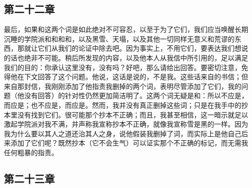 
\subsection{第二十二章}

最后，如果和这两个词是如此绝对不可容忍，以至于为了它们，我们应当唤醒长期沉睡的学院派和和和和，以及黑雪、天塌，以及其他一切同样无意义和荒谬的东西，那就让它们从我们的论证中除去吧。因为事实上，不用它们，要表达我们想说的话也绝非不可能。稍后所发现的内容，以及他本人从我信中所引用的，足以满足我们的目的：你承认这里没有，没有吗？好吧，那么请给出回答。要密切注意，免得他在下文回答了这个问题。他说，这话是说的，不是我。这些话来自的书信；但来自那封信，我刚刚添加了他指责我删掉的两个词，表明尽管添加了它们，我的问题（他没有回答）的针对性仍然更加简洁明了。这两个词无疑是和：所以不应是，而应是；也不应是，而应是。然而，我并没有真正删掉这些词；只是在我手中的抄本里没有找到它们。很可能那个抄本不正确；而且，我甚至相信，这一暗示就足以激起学院派对我不满，并声称我宣称抄本不正确，就像我宣称雪是黑的一样。因为我为什么要以其人之道还治其人之身，说他假装我删掉了词，而实际上是他自己后来添加了它们呢？既然抄本（它不会生气）可以证实那个不正确的标记，而无需我任何粗暴的指责。\par


\subsection{第二十三章}

